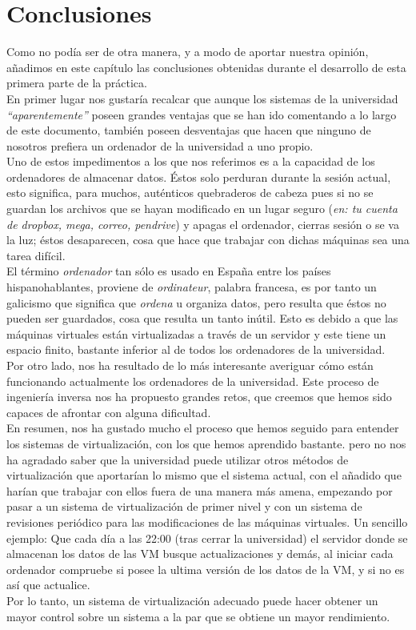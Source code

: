 \chapter{Conclusiones}
\lettrine[lines=1,slope=4pt,findent=0pt]{C}{}omo no podía ser de otra manera, y a modo de aportar nuestra opinión, añadimos en este capítulo las conclusiones obtenidas durante el desarrollo de esta primera parte de la práctica.\\

En primer lugar nos gustaría recalcar que aunque los sistemas de la universidad \emph{\textquotedblleft aparentemente\textquotedblright} poseen grandes ventajas que se han ido comentando a lo largo de este documento, también poseen desventajas que hacen que ninguno de nosotros prefiera un ordenador de la universidad a uno propio.\\

Uno de estos impedimentos a los que nos referimos es a la capacidad de los ordenadores de almacenar datos. Éstos solo perduran durante la sesión actual, esto significa, para muchos, auténticos quebraderos de cabeza pues si no se guardan los archivos que se hayan modificado en un lugar seguro (\emph{en: tu cuenta de dropbox, mega, correo, pendrive}) y apagas el ordenador, cierras sesión o se va la luz; éstos desaparecen, cosa que hace que trabajar con dichas máquinas sea una tarea difícil.\\

El término \emph{ordenador} tan sólo es usado en España entre los países hispanohablantes, proviene de \emph{ordinateur}, palabra francesa, es por tanto un galicismo que significa que \emph{ordena} u organiza datos, pero resulta que éstos no pueden ser guardados, cosa que resulta un tanto inútil. Esto es debido a que las máquinas virtuales están virtualizadas a través de un servidor y este tiene un espacio finito, bastante inferior al de todos los ordenadores de la universidad.\\

Por otro lado, nos ha resultado de lo más interesante averiguar cómo están funcionando actualmente los ordenadores de la universidad. Este proceso de ingeniería inversa nos ha propuesto grandes retos, que creemos que hemos sido capaces de afrontar con alguna dificultad.\\

En resumen, nos ha gustado mucho el proceso que hemos seguido para entender los sistemas de virtualización, con los que hemos aprendido bastante. pero no nos ha agradado saber que la universidad puede utilizar otros métodos de virtualización que aportarían lo mismo que el sistema actual, con el añadido que harían que trabajar con ellos fuera de una manera más amena, empezando por pasar a un sistema de virtualización de primer nivel y con un sistema de revisiones periódico para las modificaciones de las máquinas virtuales. Un sencillo ejemplo: Que cada día a las 22:00 (tras cerrar la universidad) el servidor donde se almacenan los datos de las VM busque actualizaciones y demás, al iniciar cada ordenador compruebe si posee la ultima versión de los datos de la VM, y si no es así que actualice.\\

Por lo tanto, un sistema de virtualización adecuado puede hacer obtener un mayor control sobre un sistema a la par que se obtiene un mayor rendimiento.
